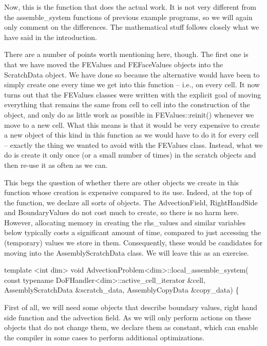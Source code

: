 Now, this is the function that does the actual work. It is not very different from the {\ttfamily assemble\+\_\+system} functions of previous example programs, so we will again only comment on the differences. The mathematical stuff follows closely what we have said in the introduction.

There are a number of points worth mentioning here, though. The first one is that we have moved the F\+E\+Values and F\+E\+Face\+Values objects into the Scratch\+Data object. We have done so because the alternative would have been to simply create one every time we get into this function -- i.\+e., on every cell. It now turns out that the F\+E\+Values classes were written with the explicit goal of moving everything that remains the same from cell to cell into the construction of the object, and only do as little work as possible in F\+E\+Values\+::reinit() whenever we move to a new cell. What this means is that it would be very expensive to create a new object of this kind in this function as we would have to do it for every cell -- exactly the thing we wanted to avoid with the F\+E\+Values class. Instead, what we do is create it only once (or a small number of times) in the scratch objects and then re-\/use it as often as we can.

This begs the question of whether there are other objects we create in this function whose creation is expensive compared to its use. Indeed, at the top of the function, we declare all sorts of objects. The {\ttfamily Advection\+Field}, {\ttfamily Right\+Hand\+Side} and {\ttfamily Boundary\+Values} do not cost much to create, so there is no harm here. However, allocating memory in creating the {\ttfamily rhs\+\_\+values} and similar variables below typically costs a significant amount of time, compared to just accessing the (temporary) values we store in them. Consequently, these would be candidates for moving into the {\ttfamily Assembly\+Scratch\+Data} class. We will leave this as an exercise.


\begin{DoxyCode}
\textcolor{keyword}{template} <\textcolor{keywordtype}{int} dim>
\textcolor{keywordtype}{void} AdvectionProblem<dim>::local\_assemble\_system(
    \textcolor{keyword}{const} \textcolor{keyword}{typename} DoFHandler<dim>::active\_cell\_iterator &cell,
    AssemblyScratchData &scratch\_data, AssemblyCopyData &copy\_data)
\{
\end{DoxyCode}


First of all, we will need some objects that describe boundary values, right hand side function and the advection field. As we will only perform actions on these objects that do not change them, we declare them as constant, which can enable the compiler in some cases to perform additional optimizations.



